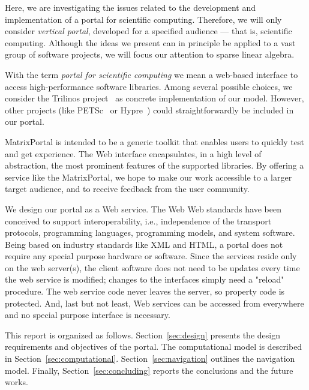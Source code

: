 \documentclass[11pt,relax]{SANDreport}
\begin{document}
Here, we are investigating the issues related to the development
and implementation of a portal for scientific computing. Therefore, we will
only consider {\sl vertical portal}, developed for a specified audience ---
that is, scientific computing. Although the ideas we present can in principle
be applied to a vast group of software projects, we will focus our attention
to sparse linear algebra.

With the term {\sl portal for scientific computing} we mean a web-based
interface to access high-performance software libraries. Among several
possible choices, we consider the Trilinos project~\cite{trilinos}
as concrete implementation
of our model. However, other projects (like PETSc~\cite{petsc-guide} 
                                       or Hypre~\cite{hypre}) could
straightforwardly be included in our portal.

MatrixPortal is intended to be a generic
toolkit that enables users to quickly test and get experience. The Web
interface encapsulates, in a high level of abstraction, the most prominent
features of the supported libraries. By offering a service like the
MatrixPortal, we hope to make our work
accessible to a larger target audience, and to receive feedback from the user
community.

We design our portal as a Web service. The Web Web standards have been
conceived to support interoperability, i.e., independence of the transport
protocols, programming languages, programming models, and system software.
Being based on industry standards like XML and HTML, a portal does not require
any special purpose hardware or software.  Since the services reside only on
the web server(s), the client software does not need to be updates every time
the web service is modified; changes to the interfaces simply need a "reload"
procedure.  The web service code never leaves the server, so property code is
protected. And, last but not least, Web services can be accessed from
everywhere and no special purpose interface is necessary.


\medskip

This report is organized as follows. Section~\ref{sec:design} presents the
design requirements and objectives of the portal. The computational model
is described in Section~\ref{sec:computational}.
Section~\ref{sec:navigation} outlines the navigation model.
Finally, Section~\ref{sec:concluding} reports the conclusions and the future
works.

\end{document}
